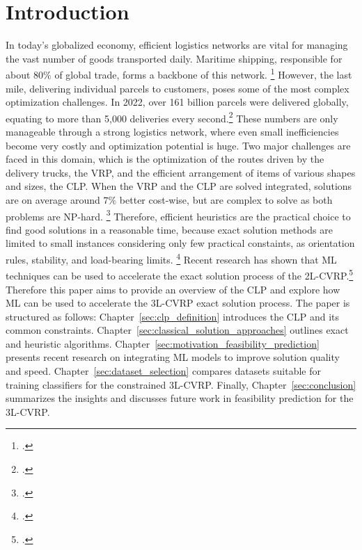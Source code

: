 \chapter{Introduction}
\label{sec:introduction}
In today’s globalized economy, efficient logistics networks are vital for managing the vast number of
goods transported daily. Maritime shipping, responsible for about $80\%$ of global trade,
forms a backbone of this network. \footcite[cf.][]{un_trade_and_development_unctad_review_2024}
However, the last mile, delivering individual parcels to customers, poses some of the most complex optimization
challenges. In 2022, over 161 billion parcels were delivered globally, equating to more than 5,000
deliveries every second.\footcite[cf.][]{statista_global_2022}
These numbers are only manageable through a strong logistics network, where even small inefficiencies
become very costly and optimization potential is huge. Two major challenges are faced in this domain, which
is the optimization of the routes driven by the delivery trucks, the \gls{VRP}, and the efficient arrangement of items
of various shapes and sizes, the \gls{CLP}. When the \gls{VRP} and the \gls{CLP} are solved integrated,
solutions are on average around $7\%$ better cost-wise, but are complex to solve as
both problems are NP-hard. \footcite[cf.][p. 23]{cote_value_2016} Therefore, efficient heuristics are the practical
choice to find good solutions in a reasonable time, because exact solution methods are limited to
small instances considering only few practical constaints, as orientation rules, stability, and load-bearing limits. \footcite[cf.][pp. 377--378]{bischoff_issues_1995}
Recent research has shown that \gls{ML} techniques can be used to accelerate the exact solution process of the \gls{2L-CVRP}.\footcite[cf.][]{zhang_learning-based_2022}
Therefore this paper aims to provide an overview
of the \gls{CLP} and explore how \gls{ML} can be used to accelerate the \gls{3L-CVRP} exact solution process.
The paper is structured as follows:
Chapter~\ref{sec:clp_definition} introduces the \gls{CLP} and its common constraints.
Chapter~\ref{sec:classical_solution_approaches} outlines exact and heuristic algorithms.
Chapter~\ref{sec:motivation_feasibility_prediction} presents recent research on integrating \gls{ML}
models to improve solution quality and speed. Chapter~\ref{sec:dataset_selection} compares datasets
suitable for training classifiers for the constrained \gls{3L-CVRP}. Finally, Chapter~\ref{sec:conclusion}
summarizes the insights and discusses future work in feasibility prediction for the \gls{3L-CVRP}.

